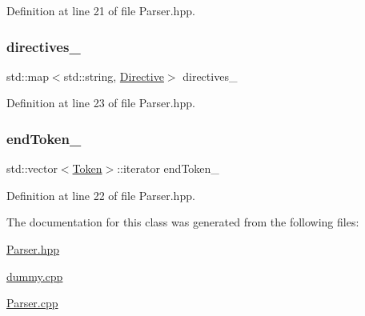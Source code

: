 Definition at line 21 of file Parser.\+hpp.

\mbox{\label{classft_1_1_parser_abe21d1e60d970dd268181e79250b5399}} 
\subsubsection{\texorpdfstring{directives\+\_\+}{directives\_}}
{\footnotesize\ttfamily std\+::map$<$std\+::string, \hyperlink{classft_1_1_directive}{Directive}$>$ directives\+\_\+\hspace{0.3cm}{\ttfamily [private]}}



Definition at line 23 of file Parser.\+hpp.

\mbox{\label{classft_1_1_parser_a538ba3ab8ee1d0cef5cc3c999f3ab44c}} 
\subsubsection{\texorpdfstring{end\+Token\+\_\+}{endToken\_}}
{\footnotesize\ttfamily std\+::vector$<$\hyperlink{classft_1_1_token}{Token}$>$\+::iterator end\+Token\+\_\+\hspace{0.3cm}{\ttfamily [private]}}



Definition at line 22 of file Parser.\+hpp.



The documentation for this class was generated from the following files\+:\begin{DoxyCompactItemize}
\item 
\hyperlink{_parser_8hpp}{Parser.\+hpp}\item 
\hyperlink{dummy_8cpp}{dummy.\+cpp}\item 
\hyperlink{_parser_8cpp}{Parser.\+cpp}\end{DoxyCompactItemize}
